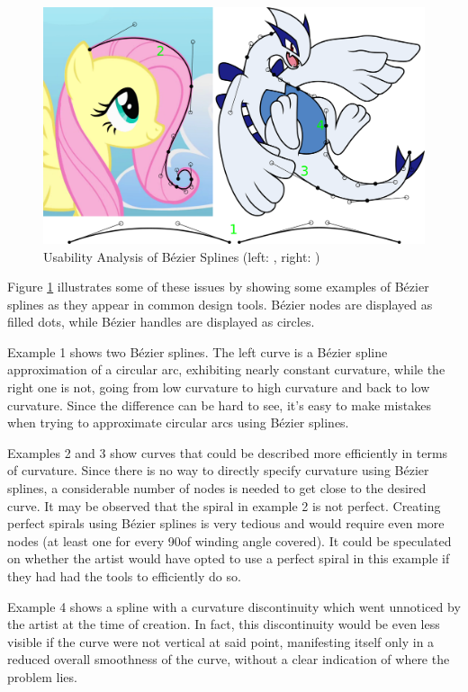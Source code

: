 \documentclass[a4paper]{article}
\begin{document}
				\begin{figure}[htb]
					\centering
					\includegraphics[width=\textwidth]{../resources/usability_bezier.pdf}
					\caption{Usability Analysis of Bézier Splines (left: \cite{Fluttershy}, right: \cite{Lugia})}
					\label{figure:usability_bézier}
				\end{figure}

				Figure \ref{figure:usability_bézier} illustrates some of these issues by showing some examples of Bézier splines as they appear in common design tools. Bézier nodes are displayed as filled dots, while Bézier handles are displayed as circles.

				Example 1 shows two Bézier splines. The left curve is a Bézier spline approximation of a circular arc, exhibiting nearly constant curvature, while the right one is not, going from low curvature to high curvature and back to low curvature. Since the difference can be hard to see, it's easy to make mistakes when trying to approximate circular arcs using Bézier splines.

				Examples 2 and 3 show curves that could be described more efficiently in terms of curvature. Since there is no way to directly specify curvature using Bézier splines, a considerable number of nodes is needed to get close to the desired curve. It may be observed that the spiral in example 2 is not perfect. Creating perfect spirals using Bézier splines is very tedious and would require even more nodes (at least one for every 90\textdegree of winding angle covered). It could be speculated on whether the artist would have opted to use a perfect spiral in this example if they had had the tools to efficiently do so.

				Example 4 shows a spline with a curvature discontinuity which went unnoticed by the artist at the time of creation. In fact, this discontinuity would be even less visible if the curve were not vertical at said point, manifesting itself only in a reduced overall smoothness of the curve, without a clear indication of where the problem lies.
\end{document}
